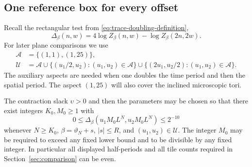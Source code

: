 \subsection{One reference box for every offset}

Recall the rectangular test from \eqref{eq:trace-doubling-definition},
\[
 \Delta_\beta(n,w)=4\log Z_\beta(n,w)-\log Z_\beta(2n,2w).
\]
For later plane comparisons we use
\begin{equation}
 \begin{split}
 \mathcal A&=\{(1,1),(1,25)\},\\
 \mathcal U&=\mathcal A
 \cup\{(u_1/2,u_2):(u_1,u_2)\in\mathcal A\}
 \cup\{(2u_1,u_2/2):(u_1,u_2)\in\mathcal A\}.
 \end{split}
 \label{eq:offset-aspect-inventory}
\end{equation}
The auxiliary aspects are needed when one doubles the time period
and then the spatial period.  The aspect $(1,25)$ will also cover
the inclined microscopic tori.

\begin{lemma}
\label{lem:offset-box-test}
The contraction slack $\upsilon>0$ and then the parameters may be
chosen so that there exist integers $K_0,M_0\ge1$ with
\begin{equation}
 0\le\Delta_\beta(u_1M_0L^N,u_2M_0L^N)\le2^{-10}
 \label{eq:offset-box-test}
\end{equation}
whenever $N\ge K_0$, $\beta=\vartheta_N+s$, $|s|\le R$, and
$(u_1,u_2)\in\mathcal U$.  The integer $M_0$ may be required to
exceed any fixed lower bound and to be divisible by any fixed
integer.  In particular all displayed half-periods and all tile
counts required in Section~\ref{sec:comparison} can be even.
\end{lemma}

